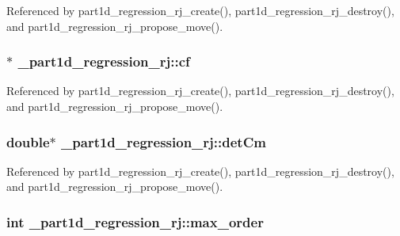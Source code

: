 Referenced by part1d\+\_\+regression\+\_\+rj\+\_\+create(), part1d\+\_\+regression\+\_\+rj\+\_\+destroy(), and part1d\+\_\+regression\+\_\+rj\+\_\+propose\+\_\+move().

\subsubsection[{\texorpdfstring{cf}{cf}}]{$\ast$ \+\_\+part1d\+\_\+regression\+\_\+rj\+::cf}\hypertarget{struct__part1d__regression__rj_a61cd2a6e82e62f8a26f408a1889fdce5}{}\label{struct__part1d__regression__rj_a61cd2a6e82e62f8a26f408a1889fdce5}


Referenced by part1d\+\_\+regression\+\_\+rj\+\_\+create(), part1d\+\_\+regression\+\_\+rj\+\_\+destroy(), and part1d\+\_\+regression\+\_\+rj\+\_\+propose\+\_\+move().

\subsubsection[{\texorpdfstring{det\+Cm}{detCm}}]{\setlength{\rightskip}{0pt plus 5cm}double$\ast$ \+\_\+part1d\+\_\+regression\+\_\+rj\+::det\+Cm}\hypertarget{struct__part1d__regression__rj_a4931ff9d62c334cc4ecf35ebffbf7950}{}\label{struct__part1d__regression__rj_a4931ff9d62c334cc4ecf35ebffbf7950}


Referenced by part1d\+\_\+regression\+\_\+rj\+\_\+create(), part1d\+\_\+regression\+\_\+rj\+\_\+destroy(), and part1d\+\_\+regression\+\_\+rj\+\_\+propose\+\_\+move().

\subsubsection[{\texorpdfstring{max\+\_\+order}{max_order}}]{\setlength{\rightskip}{0pt plus 5cm}int \+\_\+part1d\+\_\+regression\+\_\+rj\+::max\+\_\+order}\hypertarget{struct__part1d__regression__rj_a0ad14d96e6aa8af39fd496359a8856e2}{}\label{struct__part1d__regression__rj_a0ad14d96e6aa8af39fd496359a8856e2}


